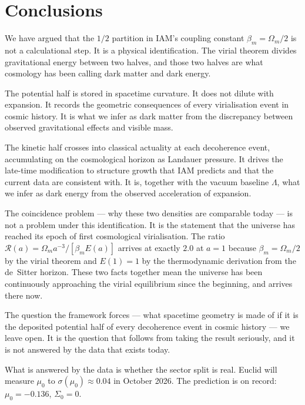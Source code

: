 \documentclass[12pt,a4paper]{article}
\begin{document}
\FloatBarrier
\section{Conclusions}

We have argued that the $1/2$ partition in IAM's coupling constant
$\beta_m = \Omega_m/2$ is not a calculational step. It is a physical
identification. The virial theorem divides gravitational energy between two
halves, and those two halves are what cosmology has been calling dark matter
and dark energy.

The potential half is stored in spacetime curvature. It does not dilute with
expansion. It records the geometric consequences of every virialisation event
in cosmic history. It is what we infer as dark matter from the discrepancy
between observed gravitational effects and visible mass.

The kinetic half crosses into classical actuality at each decoherence event,
accumulating on the cosmological horizon as Landauer pressure. It drives the
late-time modification to structure growth that IAM predicts and that the
current data are consistent with. It is, together with the vacuum baseline
$\Lambda$, what we infer as dark energy from the observed acceleration of
expansion.

The coincidence problem --- why these two densities are comparable today ---
is not a problem under this identification. It is the statement that the
universe has reached its epoch of first cosmological virialisation. The ratio
$\mathcal{R}(a) = \Omega_m a^{-3} / [\beta_m E(a)]$ arrives at exactly $2.0$
at $a = 1$ because $\beta_m = \Omega_m/2$ by the virial theorem and $E(1) = 1$
by the thermodynamic derivation from the de~Sitter horizon. These two facts
together mean the universe has been continuously approaching the virial
equilibrium since the beginning, and arrives there now.

The question the framework forces --- what spacetime geometry is made of if it
is the deposited potential half of every decoherence event in cosmic history
--- we leave open. It is the question that follows from taking the result
seriously, and it is not answered by the data that exists today.

What is answered by the data is whether the sector split is real. Euclid will
measure $\mu_0$ to $\sigma(\mu_0) \approx 0.04$ in October 2026. The
prediction is on record: $\mu_0 = -0.136$, $\Sigma_0 = 0$.
\end{document}
